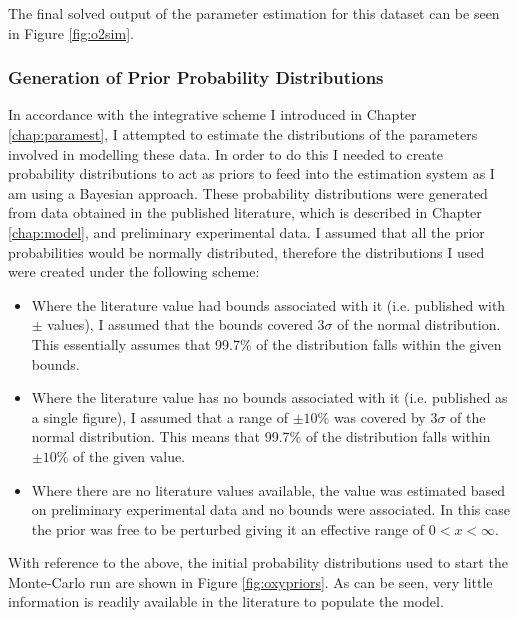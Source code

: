 The final solved output of the parameter estimation for this dataset can be seen in Figure \ref{fig:o2sim}. 
\subsubsection{Generation of Prior Probability Distributions}
In accordance with the integrative scheme I introduced in Chapter \ref{chap:paramest}, I attempted to estimate the distributions of the parameters involved in modelling these data. In order to do this I needed to create probability distributions to act as priors to feed into the estimation system as I am using a Bayesian approach. These probability distributions were generated from data obtained in the published literature, which is described in Chapter \ref{chap:model}, and preliminary experimental data. I assumed that all the prior probabilities would be normally distributed, therefore the distributions I used were created under the following scheme:
\begin{itemize}
	\item Where the literature value had bounds associated with it (i.e. published with $\pm{}$ values), I assumed that the bounds covered $3 \sigma$ of the normal distribution. This essentially assumes that 99.7\% of the distribution falls within the given bounds.
	\item Where the literature value has no bounds associated with it (i.e. published as a single figure), I assumed that a range of $\pm 10\%$ was covered by $3 \sigma$ of the normal distribution. This means that 99.7\% of the distribution falls within $\pm 10\%$ of the given value.
	\item Where there are no literature values available, the value was estimated based on preliminary experimental data and no bounds were associated. In this case the prior was free to be perturbed giving it an effective range of $0 < x < \infty$.
\end{itemize}
With reference to the above, the initial probability distributions used to start the Monte-Carlo run are shown in Figure \ref{fig:oxypriors}. As can be seen, very little information is readily available in the literature to populate the model.

